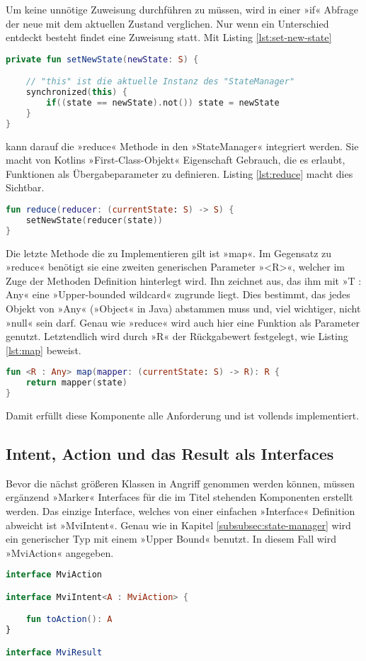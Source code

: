 Um keine unnötige Zuweisung durchführen zu müssen, wird in einer »if« Abfrage der neue mit dem aktuellen Zustand verglichen. Nur wenn ein Unterschied entdeckt besteht findet eine Zuweisung statt.
Mit Listing
\ref{lst:set-new-state}
\begin{lstlisting}[caption={ »setNewState« Methode}, label={lst:set-new-state}, language=Kotlin]
private fun setNewState(newState: S) {

	// "this" ist die aktuelle Instanz des "StateManager"
	synchronized(this) {
		if((state == newState).not()) state = newState
	}
}
\end{lstlisting}
\bigskip
kann darauf die »reduce« Methode in den »StateManager« integriert werden. Sie macht von Kotlins »First-Class-Objekt« Eigenschaft Gebrauch, die es erlaubt, Funktionen als Übergabeparameter zu definieren. Listing
\ref{lst:reduce}
macht dies Sichtbar.
\begin{lstlisting}[caption={ »reduce« Methode}, label={lst:reduce}, language=Kotlin]
fun reduce(reducer: (currentState: S) -> S) {
	setNewState(reducer(state))
}
\end{lstlisting}
\bigskip
Die letzte Methode die zu Implementieren gilt ist »map«. Im Gegensatz zu »reduce« benötigt sie eine zweiten generischen Parameter »<R>«, welcher im Zuge der Methoden Definition hinterlegt wird. Ihn zeichnet aus, das ihm mit »T : Any« eine »Upper-bounded wildcard« zugrunde liegt. Dies bestimmt, das jedes Objekt von »Any« (»Object« in Java) abstammen muss und, viel wichtiger, nicht »null« sein darf.
Genau wie »reduce« wird auch hier eine Funktion als Parameter genutzt.
Letztendlich wird durch »R« der Rückgabewert festgelegt, wie Listing
\ref{lst:map}
beweist.
\begin{lstlisting}[caption={ »map« Methode}, label={lst:map}, language=Kotlin]
fun <R : Any> map(mapper: (currentState: S) -> R): R {
	return mapper(state)
}
\end{lstlisting}
\bigskip
Damit erfüllt diese Komponente alle Anforderung und ist vollends implementiert.

\subsection{Intent, Action und das Result als Interfaces}
Bevor die nächst größeren Klassen in Angriff genommen werden können, müssen ergänzend »Marker« Interfaces für die im Titel stehenden Komponenten erstellt werden. Das einzige Interface, welches von einer einfachen »Interface« Definition abweicht ist »MviIntent«. Genau wie in Kapitel
\ref{subsubsec:state-manager}
wird ein generischer Typ mit einem »Upper Bound« benutzt. In diesem Fall wird »MviAction« angegeben.
\begin{lstlisting}[caption={»Marker« Interfaces}, label={lst:marker-interfaces}, language=Kotlin]
interface MviAction

interface MviIntent<A : MviAction> {

	fun toAction(): A
}

interface MviResult
\end{lstlisting}

